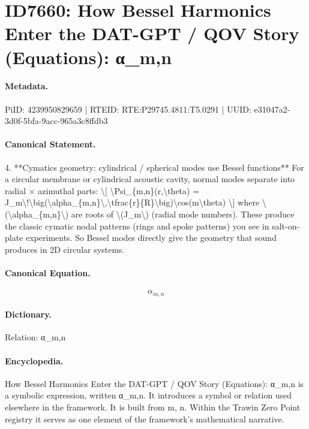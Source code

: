 \section*{ID7660: How Bessel Harmonics Enter the DAT-GPT / QOV Story (Equations): α\_m,n}
\paragraph{Metadata.}
PiID: 4239950829659 | RTEID: RTE:P29745.4811:T5.0291 | UUID: e31047a2-3d0f-5bfa-9acc-965a3c8ffdb3

\paragraph{Canonical Statement.}
4. **Cymatics geometry: cylindrical / spherical modes use Bessel functions** For a circular membrane or cylindrical acoustic cavity, normal modes separate into radial × azimuthal parts: \textbackslash{}[ \textbackslash{}Psi\_\{m,n\}(r,\textbackslash{}theta) = J\_m\textbackslash{}!\textbackslash{}big(\textbackslash{}alpha\_\{m,n\}\textbackslash{},\textbackslash{}tfrac\{r\}\{R\}\textbackslash{}big)\textbackslash{}cos(m\textbackslash{}theta) \textbackslash{}] where \textbackslash{}(\textbackslash{}alpha\_\{m,n\}\textbackslash{}) are roots of \textbackslash{}(J\_m\textbackslash{}) (radial mode numbers). These produce the classic cymatic nodal patterns (rings and spoke patterns) you see in salt-on-plate experiments. So Bessel modes directly give the geometry that sound produces in 2D circular systems.

\paragraph{Canonical Equation.}
\[
\alpha_{m,n}
\]

\paragraph{Dictionary.}
Relation: α\_m,n

\paragraph{Encyclopedia.}
How Bessel Harmonics Enter the DAT-GPT / QOV Story (Equations): α\_m,n is a symbolic expression, written α\_m,n. It introduces a symbol or relation used elsewhere in the framework. It is built from m, n. Within the Trawin Zero Point registry it serves as one element of the framework's mathematical narrative.
